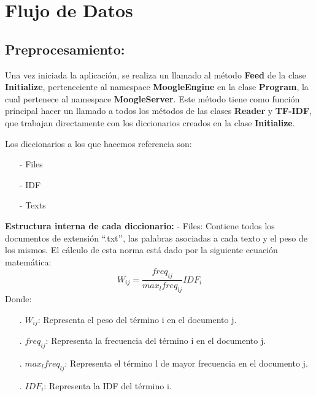 \documentclass{article}
\begin{document}
\section{Flujo de Datos}

\subsection{Preprocesamiento:}

Una vez iniciada la aplicación, se realiza un llamado al método \textbf{Feed} de la clase
\textbf{Initialize}, perteneciente al namespace \textbf{MoogleEngine} en la clase \textbf{Program}, la cual
pertenece al namespace \textbf{MoogleServer}. Este método
tiene como función principal hacer un llamado a todos los métodos de las clases
\textbf{Reader} y \textbf{TF-IDF}, que trabajan directamente con los diccionarios creados en la clase \textbf{Initialize}.
\newline
\newline

Los diccionarios a los que hacemos referencia son:
\begin{itemize}
	\item[-] Files
	\item[-] IDF
	\item[-] Texts
\end{itemize}
\textbf{Estructura interna de cada diccionario:}
\newline
\newline
- Files: Contiene todos los documentos de extensión “.txt’’, las palabras asociadas a cada
texto y el peso de los mismos. El cálculo de esta norma está dado por la siguiente ecuación
matemática:
\newline
\newline
$$
	W_{ij}=\frac{freq_{ij}}{max_{l}freq_{lj}} IDF_{i}
$$
\newline
\newline
Donde:
\begin{itemize}
	\item[.]$W_{ij}$: Representa el peso del término i en el documento j.
	\item[.]$freq_{ij}$: Representa la frecuencia del término i en el documento j.
	\item[.]$max_{l}freq_{lj}$: Representa el término l de mayor frecuencia en el documento j.
	\item[.]$IDF_{i}$: Representa la IDF del término i.
\end{itemize}
\end{document}
